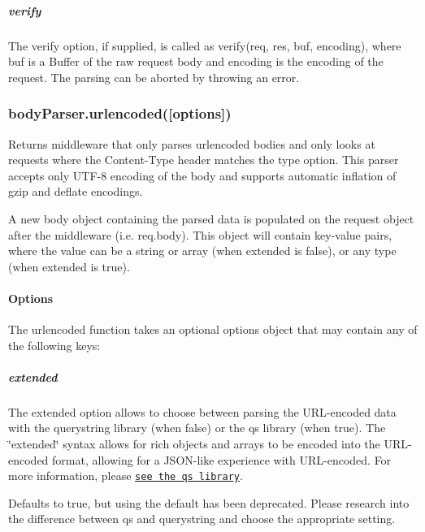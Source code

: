 \subparagraph*{verify}

The {\ttfamily verify} option, if supplied, is called as {\ttfamily verify(req, res, buf, encoding)}, where {\ttfamily buf} is a {\ttfamily Buffer} of the raw request body and {\ttfamily encoding} is the encoding of the request. The parsing can be aborted by throwing an error.

\subsubsection*{body\+Parser.\+urlencoded(\mbox{[}options\mbox{]})}

Returns middleware that only parses {\ttfamily urlencoded} bodies and only looks at requests where the {\ttfamily Content-\/\+Type} header matches the {\ttfamily type} option. This parser accepts only U\+T\+F-\/8 encoding of the body and supports automatic inflation of {\ttfamily gzip} and {\ttfamily deflate} encodings.

A new {\ttfamily body} object containing the parsed data is populated on the {\ttfamily request} object after the middleware (i.\+e. {\ttfamily req.\+body}). This object will contain key-\/value pairs, where the value can be a string or array (when {\ttfamily extended} is {\ttfamily false}), or any type (when {\ttfamily extended} is {\ttfamily true}).

\paragraph*{Options}

The {\ttfamily urlencoded} function takes an optional {\ttfamily options} object that may contain any of the following keys\+:

\subparagraph*{extended}

The {\ttfamily extended} option allows to choose between parsing the U\+R\+L-\/encoded data with the {\ttfamily querystring} library (when {\ttfamily false}) or the {\ttfamily qs} library (when {\ttfamily true}). The \char`\"{}extended\char`\"{} syntax allows for rich objects and arrays to be encoded into the U\+R\+L-\/encoded format, allowing for a J\+S\+O\+N-\/like experience with U\+R\+L-\/encoded. For more information, please \href{https://www.npmjs.org/package/qs#readme}{\tt see the qs library}.

Defaults to {\ttfamily true}, but using the default has been deprecated. Please research into the difference between {\ttfamily qs} and {\ttfamily querystring} and choose the appropriate setting.

